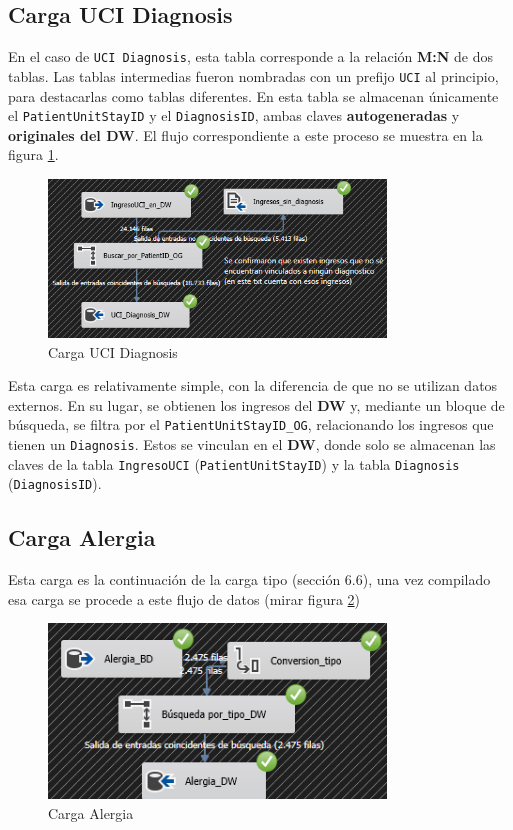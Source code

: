 \documentclass[12pt, a4paper, twoside]{article}
\begin{document}
	
	
	\subsection{Carga UCI Diagnosis}
	
	En el caso de \texttt{UCI Diagnosis}, esta tabla corresponde a la relación \textbf{M:N} de dos tablas. Las tablas intermedias fueron nombradas con un prefijo \texttt{UCI} al principio, para destacarlas como tablas diferentes. En esta tabla se almacenan únicamente el \texttt{PatientUnitStayID} y el \texttt{DiagnosisID}, ambas claves \textbf{autogeneradas} y \textbf{originales del DW}. El flujo correspondiente a este proceso se muestra en la figura \ref{fig:40}.
	
	
	\begin{figure}[H]
		\centering
		\includegraphics[width=0.8\textwidth]{image/113_carga_UCI_Diagnosis.png}
		\caption{Carga UCI Diagnosis}
		\label{fig:40}
	\end{figure}
	
	Esta carga es relativamente simple, con la diferencia de que no se utilizan datos externos. En su lugar, se obtienen los ingresos del \textbf{DW} y, mediante un bloque de búsqueda, se filtra por el \texttt{PatientUnitStayID\_OG}, relacionando los ingresos que tienen un \texttt{Diagnosis}. Estos se vinculan en el \textbf{DW}, donde solo se almacenan las claves de la tabla \texttt{IngresoUCI} (\texttt{PatientUnitStayID}) y la tabla \texttt{Diagnosis} (\texttt{DiagnosisID}).
	
	
	\subsection{Carga Alergia}
	
	Esta carga es la continuación de la carga tipo (sección 6.6), una vez compilado esa carga se procede a este flujo de datos (mirar figura \ref{fig:36})
	
	\begin{figure}[H]
		\centering
		\includegraphics[width=0.8\textwidth]{image/115_carga_alergia.png}
		\caption{Carga Alergia}
		\label{fig:36}
	\end{figure}
	
\end{document}
